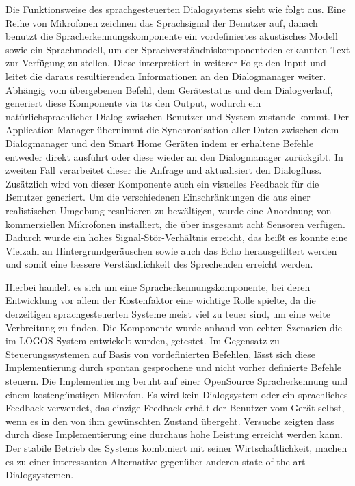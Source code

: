 Die Funktionsweise des sprachgesteuerten Dialogsystems sieht wie folgt aus. Eine Reihe von Mikrofonen zeichnen das Sprachsignal der Benutzer auf, danach benutzt die Spracherkennungskomponente ein vordefiniertes akustisches Modell sowie ein Sprachmodell, um der \glqq Sprachverständniskomponente\grqq den erkannten Text zur Verfügung zu stellen. Diese interpretiert in weiterer Folge den Input und leitet die daraus resultierenden Informationen an den Dialogmanager weiter. Abhängig vom übergebenen Befehl, dem Gerätestatus und dem Dialogverlauf, generiert diese Komponente via \gls{tts} den Output, wodurch ein natürlichsprachlicher Dialog zwischen Benutzer und System zustande kommt. Der Application-Manager übernimmt die Synchronisation aller Daten zwischen dem Dialogmanager und den Smart Home Geräten indem er erhaltene Befehle entweder direkt ausführt oder diese wieder an den Dialogmanager zurückgibt. In zweiten Fall verarbeitet dieser die Anfrage und aktualisiert den Dialogfluss. Zusätzlich wird von dieser Komponente auch ein visuelles Feedback für die Benutzer generiert. Um die verschiedenen Einschränkungen die aus einer realistischen Umgebung resultieren zu bewältigen, wurde eine Anordnung von kommerziellen Mikrofonen installiert, die über insgesamt acht Sensoren verfügen. Dadurch wurde ein hohes Signal-Stör-Verhältnis erreicht, das heißt es konnte eine Vielzahl an Hintergrundgeräuschen sowie auch das Echo herausgefiltert werden und somit eine bessere Verständlichkeit des Sprechenden erreicht werden.

Hierbei handelt es sich um eine Spracherkennungskomponente, bei deren Entwicklung vor allem der Kostenfaktor eine wichtige Rolle spielte, da die derzeitigen sprachgesteuerten Systeme meist viel zu teuer sind, um eine weite Verbreitung zu finden. Die Komponente wurde anhand von echten Szenarien die im LOGOS System entwickelt wurden, getestet. Im Gegensatz zu Steuerungssystemen auf Basis von vordefinierten Befehlen, lässt sich diese Implementierung durch spontan gesprochene und nicht vorher definierte Befehle steuern. Die Implementierung beruht auf einer OpenSource Spracherkennung und einem kostengünstigen Mikrofon. Es wird kein Dialogsystem oder ein sprachliches Feedback verwendet, das einzige Feedback erhält der Benutzer vom Gerät selbst, wenn es in den von ihm gewünschten Zustand übergeht. Versuche zeigten dass durch diese Implementierung eine durchaus hohe Leistung erreicht werden kann. Der stabile Betrieb des Systems kombiniert mit seiner Wirtschaftlichkeit, machen es zu einer interessanten Alternative gegenüber anderen state-of-the-art Dialogsystemen.

